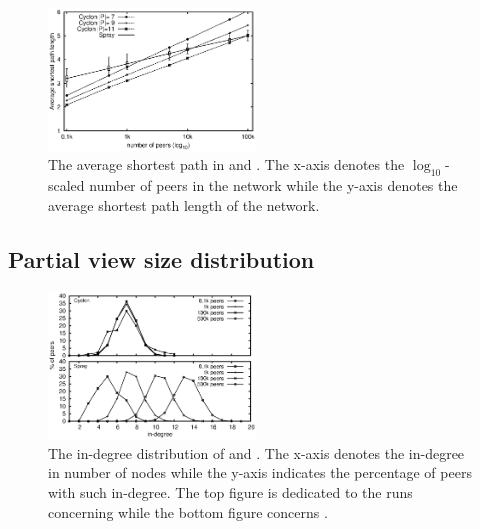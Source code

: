 \begin{figure}
  \centering
  \includegraphics[width=0.49\textwidth]{img/avgpath.eps}
  \caption{\label{fig:avgpath}The average shortest path in \SPRAY and
    \CYCLON. The x-axis denotes the $\log_{10}$-scaled number of peers in the
    network while the y-axis denotes the average shortest path length of the
    network.}
\end{figure}

\subsection{Partial view size distribution}
\label{subsec:dist}

\begin{figure}
  \centering
  \includegraphics[width=0.49\textwidth]{img/histo.eps}
  \caption{\label{fig:histo}The in-degree distribution of \CYCLON and
    \SPRAY. The x-axis denotes the in-degree in number of nodes while the
    y-axis indicates the percentage of peers with such in-degree. The top
    figure is dedicated to the runs concerning \CYCLON while the bottom figure
    concerns \SPRAY.}
\end{figure}


